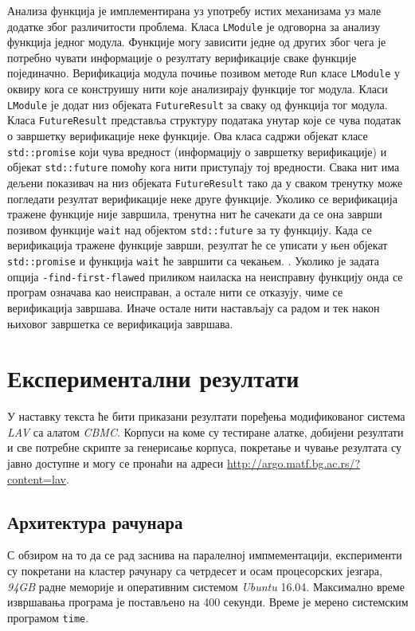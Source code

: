 \documentclass[12pt,oneside]{memoir}
\begin{document}
Анализа функција је имплементирана уз употребу истих механизама уз мале додатке због различитости проблема.   
 Класа \texttt{LModule} је одговорна за анализу функција једног модула. Функције могу зависити једне од других због чега је потребно чувати информације о резултату верификације сваке функције појединачно. Верификација модула почиње позивом методе \texttt{Run} класе \texttt{LModule} у оквиру кога се конструишу нити које анализирају функције тог модула. Класи \texttt{LModule} је додат низ објеката \texttt{FutureResult} за сваку од функција тог модула. Класа \texttt{FutureResult} представља структуру података унутар које се чува податак о завршетку верификације неке функције. Ова класа садржи објекат класе \texttt{std::promise}  који чува вредност (информацију о завршетку верификације) и објекат \texttt{std::future} помоћу кога нити приступају тој вредности. Свака нит има дељени показивач на низ објеката \texttt{FutureResult} тако да у сваком тренутку може погледати резултат верификације неке друге функције. Уколико се верификација тражене функције није завршила, тренутна нит ће сачекати да се она заврши позивом функције \texttt{wait} над објектом \texttt{std::future} за ту функцију. Када се верификација тражене функције заврши, резултат ће се уписати у њен објекат \texttt{std::promise} и функција \texttt{wait} ће завршити са чекањем. . Уколико је задата опција \texttt{-find-first-flawed} приликом наиласка на неисправну функцију онда се програм означава као неисправан, а остале нити се отказују, чиме се верификација завршава. Иначе остале нити настављају са радом и тек након њиховог завршетка се верификација завршава.

\chapter{Експериментални резултати}

У наставку текста ће бити приказани резултати поређења модификованог система \textit{LAV} са алатом \textit{CBMC}. Корпуси на коме су тестиране алатке, добијени резултати и све потребне скрипте за генерисање корпуса, покретање и чување резултата су јавно доступне и могу се пронаћи на адреси \url{http://argo.matf.bg.ac.rs/?content=lav}.


  \section{Архитектура рачунара}
  
  С обзиром на то да се рад заснива на паралелној импмементацији, експерименти су покретани на кластер рачунару са четрдесет и осам процесорских језгара, \textit{94GB} радне меморије и оперативним системом \textit{Ubuntu} 16.04. Максимално време извршавања програма је постављено на 400 секунди. Време је мерено системским програмом \texttt{time}.
  
\end{document}

